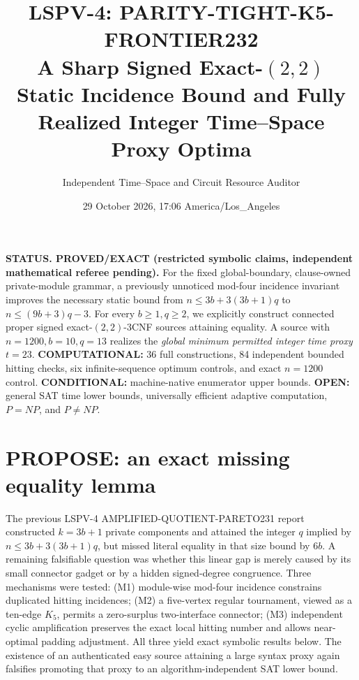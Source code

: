 \documentclass[11pt]{article}
\title{LSPV-4: PARITY-TIGHT-K5-FRONTIER232\\[3pt]\large A Sharp Signed Exact-$(2,2)$ Static Incidence Bound and Fully Realized Integer Time--Space Proxy Optima}
\author{Independent Time--Space and Circuit Resource Auditor}
\date{29 October 2026, 17:06 America/Los\_Angeles}
\begin{document}
\maketitle
\noindent\textbf{STATUS. PROVED/EXACT (restricted symbolic claims, independent mathematical referee pending).} For the fixed global-boundary, clause-owned private-module grammar, a previously unnoticed mod-four incidence invariant improves the necessary static bound from $n\le3b+3(3b+1)q$ to $n\le(9b+3)q-3$. For every $b\ge1,q\ge2$, we explicitly construct connected proper signed exact-$(2,2)$-3CNF sources attaining equality. A source with $n=1200,b=10,q=13$ realizes the \emph{global minimum permitted integer time proxy} $t=23$. \textbf{COMPUTATIONAL:} 36 full constructions, 84 independent bounded hitting checks, six infinite-sequence optimum controls, and exact $n=1200$ control. \textbf{CONDITIONAL:} machine-native enumerator upper bounds. \textbf{OPEN:} general SAT time lower bounds, universally efficient adaptive computation, $P=NP$, and $P\ne NP$.

\section{PROPOSE: an exact missing equality lemma}
The previous LSPV-4 AMPLIFIED-QUOTIENT-PARETO231 report \cite{amplified} constructed $k=3b+1$ private components and attained the integer $q$ implied by $n\le3b+3(3b+1)q$, but missed literal equality in that size bound by $6b$. A remaining falsifiable question was whether this linear gap is merely caused by its small connector gadget or by a hidden signed-degree congruence. Three mechanisms were tested: (M1) module-wise mod-four incidence constrains duplicated hitting incidences; (M2) a five-vertex regular tournament, viewed as a ten-edge $K_5$, permits a zero-surplus two-interface connector; (M3) independent cyclic amplification preserves the exact local hitting number and allows near-optimal padding adjustment. All three yield exact symbolic results below. The existence of an authenticated easy source attaining a large syntax proxy again falsifies promoting that proxy to an algorithm-independent SAT lower bound.
\end{document}
